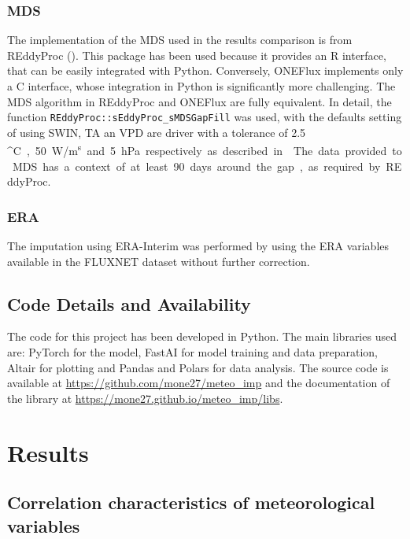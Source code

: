 \documentclass{article}
\let\Oldsection\section
\renewcommand{\section}{\FloatBarrier\Oldsection}
\let\Oldsubsection\subsection
\renewcommand{\subsection}{\FloatBarrier\Oldsubsection}
\begin{document}
\subsubsection{MDS}

The implementation of the MDS used in the results comparison is from REddyProc (\cite{wutzler_basic_2018}). This package has been used because it provides an R interface, that can be easily integrated with Python. Conversely, ONEFlux implements only a C interface, whose integration in Python is significantly more challenging.  The MDS algorithm in REddyProc and ONEFlux are fully equivalent. In detail, the function \verb|REddyProc::sEddyProc_sMDSGapFill| was used, with the defaults setting of using SW\textunderscore IN, TA an VPD are driver with a tolerance of 2.5 \si{^\circ C}, 50 \si{W/m^s} and 5 \si{hPa} respectively as described in \cite{reichstein_separation_2005-3}.
The data provided to MDS has a context of at least 90 days around the gap, as required by REddyProc. 

\subsubsection{ERA} The imputation using ERA-Interim was performed by using the ERA variables available in the FLUXNET dataset without further correction.

\subsection{Code Details and Availability}

The code for this project has been developed in Python. The main libraries used are: \textsf{PyTorch} \cite{NEURIPS2019_9015} for the model,  \textsf{FastAI} \cite{howard_fastai_2020} for model training and data preparation, \textsf{Altair} \cite{VanderPlas2018,Satyanarayan2017} for plotting and \textsf{Pandas} and \textsf{Polars} for data analysis. The source code is available at \url{https://github.com/mone27/meteo_imp} and the documentation of the library at \url{https://mone27.github.io/meteo_imp/libs}.
\pagebreak

\section{Results}

\subsection{Correlation characteristics of meteorological variables}
\end{document}
